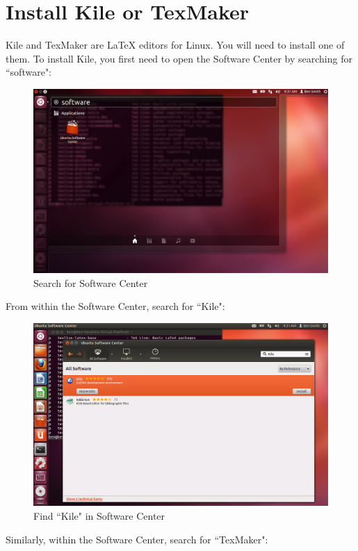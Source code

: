 \documentclass[11pt]{article}
\begin{document}
\section{Install Kile or TexMaker}

Kile and TexMaker are LaTeX editors for Linux.  You will need to install one of them.  To install Kile, you first need to open the Software Center by searching for ``software":

\begin{figure}[!h]
	\centering
	\includegraphics[width=5in]{graphics/OpenSoftwareCenter.png}
	\caption{Search for Software Center}
\end{figure}

From within the Software Center, search for ``Kile":

\begin{figure}[!h]
	\centering
	\includegraphics[width=5in]{graphics/FindKile.png}
	\caption{Find ``Kile" in Software Center}
\end{figure}

Similarly, within the Software Center, search for ``TexMaker":
\end{document}

